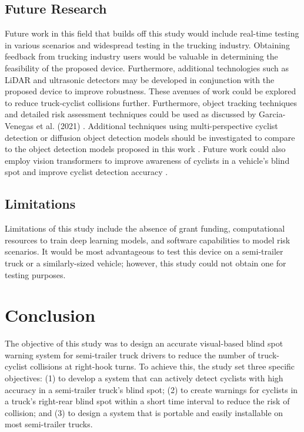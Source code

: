 \documentclass{article}
\begin{document}
\subsection{Future Research}
Future work in this field that builds off this study would include real-time testing in various scenarios and widespread testing in the trucking industry. Obtaining feedback from trucking industry users would be valuable in determining the feasibility of the proposed device. Furthermore, additional technologies such as LiDAR and ultrasonic detectors may be developed in conjunction with the proposed device to improve robustness. These avenues of work could be explored to reduce truck-cyclist collisions further. Furthermore, object tracking techniques and detailed risk assessment techniques could be used as discussed by Garcia-Venegas et al. (2021) \cite{garcia-venegas_safety_2021}. Additional techniques using multi-perspective cyclist detection or diffusion object detection models should be investigated to compare to the object detection models proposed in this work \cite{chen_diffusiondet_2022}. Future work could also employ vision transformers to improve awareness of cyclists in a vehicle’s blind spot and improve cyclist detection accuracy \cite{dosovitskiy_image_2021}. 

\subsection{Limitations}
Limitations of this study include the absence of grant funding, computational resources to train deep learning models, and software capabilities to model risk scenarios. It would be most advantageous to test this device on a semi-trailer truck or a similarly-sized vehicle; however, this study could not obtain one for testing purposes.

\section{Conclusion}
The objective of this study was to design an accurate visual-based blind spot warning system for semi-trailer truck drivers to reduce the number of truck-cyclist collisions at right-hook turns. To achieve this, the study set three specific objectives: (1) to develop a system that can actively detect cyclists with high accuracy in a semi-trailer truck's blind spot; (2) to create warnings for cyclists in a truck's right-rear blind spot within a short time interval to reduce the risk of collision; and (3) to design a system that is portable and easily installable on most semi-trailer trucks.
\end{document}
